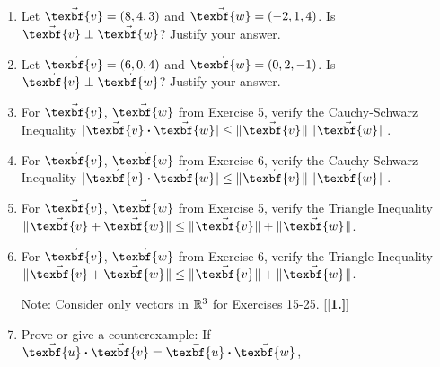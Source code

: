 \begin{enumerate}[\bfseries 1.]
 \item Let $\vec{\texbf{v}} = (8,4,3)$ and $\vec{\texbf{w}} = (-2,1,4)$. Is $\vec{\texbf{v}} \perp \vec{\texbf{w}}$? Justify your answer.
 \item Let $\vec{\texbf{v}} = (6,0,4)$ and $\vec{\texbf{w}} = (0,2,-1)$. Is $\vec{\texbf{v}} \perp \vec{\texbf{w}}$? Justify your answer.
 \item For $\vec{\texbf{v}}$, $\vec{\texbf{w}}$ from Exercise 5, verify the Cauchy-Schwarz Inequality
  $\abs{\Dotprod{\vec{\texbf{v}}}{\vec{\texbf{w}}}} \le \norm{\vec{\texbf{v}}}\,\norm{\vec{\texbf{w}}}$.
 \item For $\vec{\texbf{v}}$, $\vec{\texbf{w}}$ from Exercise 6, verify the Cauchy-Schwarz Inequality
  $\abs{\Dotprod{\vec{\texbf{v}}}{\vec{\texbf{w}}}} \le \norm{\vec{\texbf{v}}}\,\norm{\vec{\texbf{w}}}$.
 \item For $\vec{\texbf{v}}$, $\vec{\texbf{w}}$ from Exercise 5, verify the Triangle Inequality
  $\norm{\vec{\texbf{v}} + \vec{\texbf{w}}} \le \norm{\vec{\texbf{v}}} + \norm{\vec{\texbf{w}}}$.
 \item For $\vec{\texbf{v}}$, $\vec{\texbf{w}}$ from Exercise 6, verify the Triangle Inequality
  $\norm{\vec{\texbf{v}} + \vec{\texbf{w}}} \le \norm{\vec{\texbf{v}}} + \norm{\vec{\texbf{w}}}$.
\vspace{1mm}
\par\noindent Note: Consider only vectors in $\mathbb{R}^{3}$ for Exercises 15-25.\vspace{1mm}
[{[\bfseries 1.]}]
 \item Prove or give a counterexample: If $\Dotprod{\vec{\texbf{u}}}{\vec{\texbf{v}}} = \Dotprod{\vec{\texbf{u}}}{\vec{\texbf{w}}}$,

\end{enumerate}
